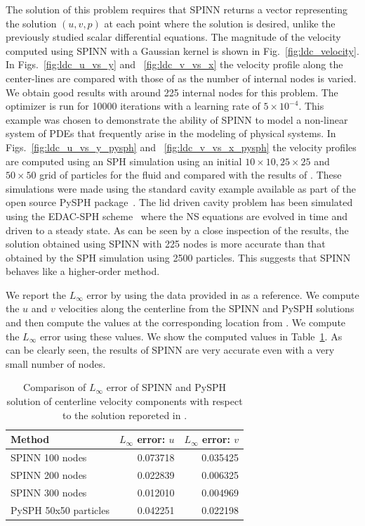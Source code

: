 \documentclass[12pt]{article}
\newcommand{\rr}[1]{#1}
\newcommand{\rb}[1]{#1}
\begin{document}
The solution of this problem requires that SPINN returns a vector representing the solution $(u, v, p)$ at each point where the solution is desired, unlike the previously studied scalar differential equations. The magnitude of the velocity computed using SPINN \rb{with a Gaussian kernel} is shown in Fig.~\ref{fig:ldc_velocity}.  In Figs.~\ref{fig:ldc_u_vs_y} and ~\ref{fig:ldc_v_vs_x} the velocity profile along the center-lines are compared with those of \cite{ldc:ghia} as the number of internal nodes is varied.  We obtain good results with around 225 internal nodes for this problem.  \rb{The optimizer is run for 10000 iterations with a learning rate of $5 \times 10^{-4}$.} This example was chosen to demonstrate the ability of SPINN to model a non-linear system of PDEs that frequently arise in the modeling of physical systems. \rb{In Figs.~\ref{fig:ldc_u_vs_y_pysph} and ~\ref{fig:ldc_v_vs_x_pysph} the velocity profiles are computed using an SPH simulation using an initial  $10 \times 10, 25 \times 25$ and  $50\times 50$ grid of particles for the fluid and compared with the results of \cite{ldc:ghia}.  These simulations were made using the standard cavity example available as part of the open source PySPH package~\cite{pysph2020}.  The lid driven cavity problem has been simulated using the EDAC-SPH scheme~\cite{edac-sph:cf:2019} where the NS equations are evolved in time and driven to a steady state.
As can be seen by a close inspection of the results, the solution obtained using SPINN with 225 nodes is more accurate than that obtained by the SPH simulation using 2500 particles.  This suggests that SPINN behaves like a higher-order method.}

\rr{We report the $L_{\infty}$ error by using the data provided in \cite{ldc:ghia} as a reference.  We compute the $u$ and $v$ velocities along the centerline from the SPINN and PySPH solutions and then compute the values at the corresponding location from \cite{ldc:ghia}.  We compute the $L_{\infty}$ error using these values.  We show the computed values in Table~\ref{tab:cavity_error}.  As can be clearly seen, the results of SPINN are very accurate even with a very small number of nodes.}

\begin{table}
\centering
\begin{tabular}{lrr}
\toprule
  Method      &   $L_{\infty}$ error:  $u$ &   $L_\infty$ error: $v$ \\
\midrule
  SPINN 100 nodes & 0.073718 & 0.035425 \\
  SPINN 200 nodes  & 0.022839 & 0.006325 \\
  SPINN 300 nodes & 0.012010 & 0.004969 \\
PySPH 50x50 particles & 0.042251 & 0.022198 \\
\bottomrule
\end{tabular}
\caption{Comparison of $L_\infty$ error of SPINN and PySPH solution of centerline velocity components with respect to the solution reporeted in \cite{ldc:ghia}.}
\label{tab:cavity_error}
\end{table}
\end{document}
